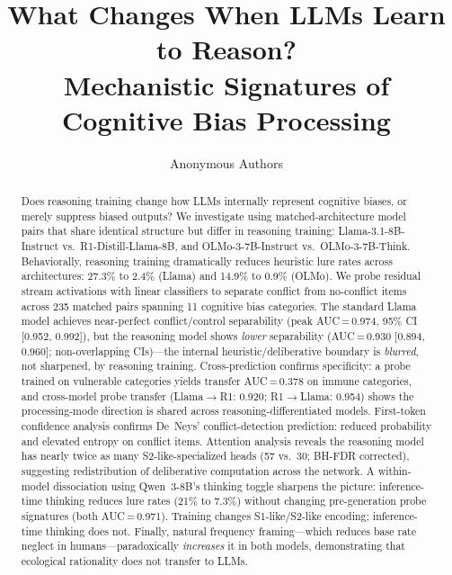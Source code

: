 \documentclass[accepted]{article}
\title{What Changes When LLMs Learn to Reason?\\
  Mechanistic Signatures of Cognitive Bias Processing}
\author{%
  Anonymous Authors
}
\date{}
\newcommand{\sone}{S1-like}
\newcommand{\stwo}{S2-like}
\begin{document}
\maketitle


\begin{abstract}
Does reasoning training change how LLMs internally represent cognitive
biases, or merely suppress biased outputs?  We investigate using
matched-architecture model pairs that share identical structure but
differ in reasoning training:
Llama-3.1-8B-Instruct vs.\ R1-Distill-Llama-8B, and
OLMo-3-7B-Instruct vs.\ OLMo-3-7B-Think.  Behaviorally, reasoning
training dramatically reduces heuristic lure rates across architectures:
27.3\% to 2.4\% (Llama) and 14.9\% to 0.9\% (OLMo).  We probe
residual stream activations with linear classifiers to separate conflict
from no-conflict items across 235 matched pairs spanning 11 cognitive
bias categories.  The standard Llama model achieves near-perfect
conflict/control separability (peak AUC\,=\,0.974, 95\% CI [0.952,
0.992]), but the reasoning model shows \emph{lower} separability
(AUC\,=\,0.930 [0.894, 0.960]; non-overlapping CIs)---the internal
heuristic/deliberative boundary is \emph{blurred}, not sharpened, by
reasoning training.  Cross-prediction confirms specificity: a probe
trained on vulnerable categories yields transfer AUC\,=\,0.378 on
immune categories, and cross-model probe transfer (Llama$\to$R1:
0.920; R1$\to$Llama: 0.954) shows the processing-mode direction is
shared across reasoning-differentiated models.  First-token confidence
analysis confirms De~Neys' conflict-detection prediction: reduced
probability and elevated entropy on conflict items.  Attention analysis reveals the reasoning model has nearly
twice as many \stwo{}-specialized heads (57 vs.\ 30; BH-FDR corrected),
suggesting redistribution of deliberative computation across the
network.  A within-model dissociation using Qwen~3-8B's thinking toggle
sharpens the picture: inference-time thinking reduces lure rates (21\%
to 7.3\%) without changing pre-generation probe signatures (both
AUC\,=\,0.971).  Training changes \sone{}/\stwo{} encoding;
inference-time thinking does not.  Finally, natural frequency
framing---which reduces base rate neglect in humans---paradoxically
\emph{increases} it in both models, demonstrating that ecological
rationality does not transfer to LLMs.
\end{abstract}
\end{document}

